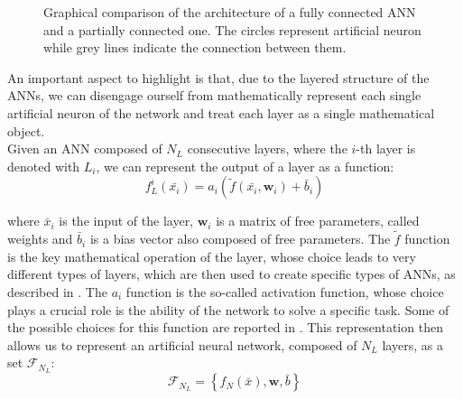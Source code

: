 \begin{figure}[h]
    \centering
    \begin{minipage}[c]{0.49\linewidth}
        \vspace{0pt}
        \centering
    \end{minipage}%
    \hfill%
    \begin{minipage}[c]{0.49\linewidth}
        \vspace{0pt}
        \centering
    \end{minipage}%
    \caption{Graphical comparison of the architecture of a fully connected ANN and a partially connected one. The circles represent artificial neuron while grey lines indicate the connection between them.}
    \label{fig:full_part_ANN}
\end{figure}

An important aspect to highlight is that, due to the layered structure of the ANNs, we can disengage ourself from mathematically represent each single artificial neuron of the network and treat each  layer as a single mathematical object. \\
Given an ANN composed of $N_L$ consecutive layers, where the $i$-th layer is denoted with $L_i$, we can represent the output of a layer as a function:
\begin{equation}
    f_L^i (\bar{x_i})=a_i \left( \tilde{f}(\bar{x_i}, \boldsymbol{w}_i) + \bar{b}_i \right) 
    \label{eq:layer_math}
\end{equation}

where $\bar{x}_i$ is the input of the layer, $\boldsymbol{w}_i$ is a matrix of free parameters, called weights and $\bar{b}_i$ is a bias vector also composed of free parameters. The $\tilde{f}$ function is the key mathematical operation of the layer, whose choice leads to very different types of layers, which are then used to create specific types of ANNs, as described in . The $a_i$ function is the so-called activation function, whose choice plays a crucial role is the ability of the network to solve a specific task. Some of the possible choices for this function are reported in .
This representation then allows us to represent an artificial neural network, composed of $N_L$ layers, as a set $\mathcal{F}_{N_L}$:
\begin{equation}
\mathcal{F}_{N_L} = \left\{ f_N(\bar{x}), \boldsymbol{w}, \bar{b}\right\}
\end{equation}

